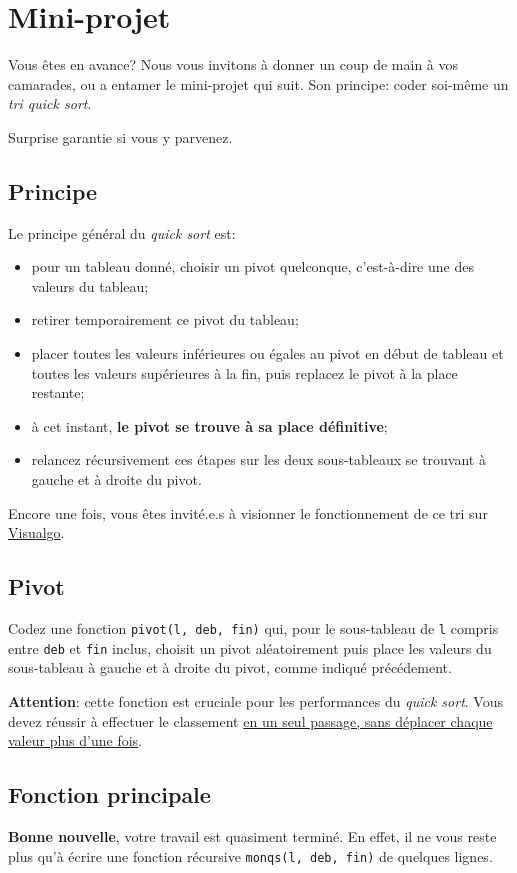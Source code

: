 \documentclass[11pt,a4paper]{article}
\begin{document}
\newpage
\section{Mini-projet}
Vous êtes en avance? Nous vous invitons à donner un coup de main à vos camarades, ou a entamer le mini-projet qui suit. Son principe: coder soi-même un {\em tri quick sort}.\ 

Surprise garantie si vous y parvenez.
\subsection{Principe}
Le principe général du {\em quick sort} est:
\begin{itemize}
  \item pour un tableau donné, choisir un pivot quelconque, c'est-à-dire une des valeurs du tableau;
  \item retirer temporairement ce pivot du tableau;
  \item placer toutes les valeurs inférieures ou égales au pivot en début de tableau et toutes les valeurs supérieures à la fin, puis replacez le pivot à la place restante;
  \item à cet instant, {\bf le pivot se trouve à sa place définitive};
  \item relancez récursivement ces étapes sur les deux sous-tableaux se trouvant à gauche et à droite du pivot.
\end{itemize}
Encore une fois, vous êtes invité.e.s à visionner le fonctionnement de ce tri sur \href{https://visualgo.net/en/sorting}{Visualgo}.

\subsection{Pivot}
Codez une fonction {\tt pivot(l, deb, fin)} qui, pour le sous-tableau de {\tt l} compris entre {\tt deb} et {\tt fin} inclus, choisit un pivot aléatoirement puis place les valeurs du sous-tableau à gauche et à droite du pivot, comme indiqué précédement.\ 

{\bf Attention}: cette fonction est cruciale pour les performances du {\em quick sort}. Vous devez réussir à effectuer le classement \underline{en un seul passage, sans déplacer chaque valeur plus d'une fois}.

\subsection{Fonction principale}
{\bf Bonne nouvelle}, votre travail est quasiment terminé. En effet, il ne vous reste plus qu'à écrire une fonction récursive {\tt monqs(l, deb, fin)} de quelques lignes.
\end{document}
